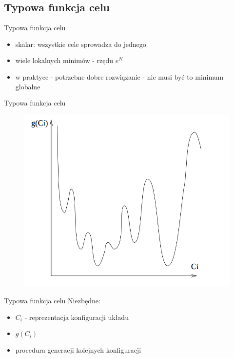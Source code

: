 \subsection{Typowa funkcja celu}
	\begin{frame}{Typowa funkcja celu}
		\begin{itemize}
			\item skalar: wszystkie cele sprowadza do jednego
			\item wiele lokalnych minimów - rzędu $e^N$
			\item w praktyce - potrzebne dobre rozwiązanie - nie musi być to minimum globalne
		\end{itemize}

	\end{frame}


	\begin{frame}{Typowa funkcja celu}
		\begin{figure}
			\includegraphics[height=0.9\textheight]{img/18/target_fun}
		\end{figure}
	\end{frame}


	\begin{frame}{Typowa funkcja celu}
		Niezbędne:
		\begin{itemize}
			\item $C_i$ - reprezentacja konfiguracji układu
			\item $g(C_i)$
			\item procedura generacji kolejnych konfiguracji
		\end{itemize}
	\end{frame}

